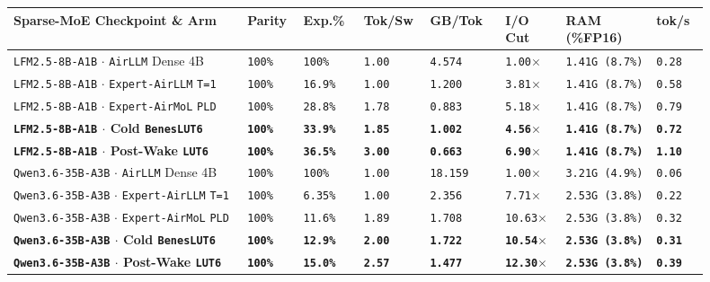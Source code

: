 \documentclass[10pt]{article}
\begin{document}
{\footnotesize\setlength{\tabcolsep}{2.8pt}
\begin{longtable}{@{}L{0.31\linewidth}C{0.07\linewidth}C{0.08\linewidth}C{0.07\linewidth}C{0.10\linewidth}C{0.08\linewidth}C{0.12\linewidth}C{0.07\linewidth}@{}}
\toprule
\textbf{Sparse-MoE Checkpoint \& Arm} & \textbf{Parity} & \textbf{Exp.\%} & \textbf{Tok/Sw} & \textbf{GB/Tok} & \textbf{I/O Cut} & \textbf{RAM (\%FP16)} & \textbf{tok/s} \\
\midrule
\endhead
\texttt{LFM2.5-8B-A1B} $\cdot$ \texttt{AirLLM} Dense 4B & \texttt{100\%} & \texttt{100\%} & \texttt{1.00} & \texttt{4.574} & \texttt{1.00$\times$} & \texttt{1.41G (8.7\%)} & \texttt{0.28} \\
\texttt{LFM2.5-8B-A1B} $\cdot$ \texttt{Expert-AirLLM} \texttt{T=1} & \texttt{100\%} & \texttt{16.9\%} & \texttt{1.00} & \texttt{1.200} & \texttt{3.81$\times$} & \texttt{1.41G (8.7\%)} & \texttt{0.58} \\
\texttt{LFM2.5-8B-A1B} $\cdot$ \texttt{Expert-AirMoL} \texttt{PLD} & \texttt{100\%} & \texttt{28.8\%} & \texttt{1.78} & \texttt{0.883} & \texttt{5.18$\times$} & \texttt{1.41G (8.7\%)} & \texttt{0.79} \\
\textbf{\texttt{LFM2.5-8B-A1B} $\cdot$ Cold \texttt{BenesLUT6}} & \textbf{\texttt{100\%}} & \textbf{\texttt{33.9\%}} & \textbf{\texttt{1.85}} & \textbf{\texttt{1.002}} & \textbf{\texttt{4.56$\times$}} & \textbf{\texttt{1.41G (8.7\%)}} & \textbf{\texttt{0.72}} \\
\textbf{\texttt{LFM2.5-8B-A1B} $\cdot$ Post-Wake \texttt{LUT6}} & \textbf{\texttt{100\%}} & \textbf{\texttt{36.5\%}} & \textbf{\texttt{3.00}} & \textbf{\texttt{0.663}} & \textbf{\texttt{6.90$\times$}} & \textbf{\texttt{1.41G (8.7\%)}} & \textbf{\texttt{1.10}} \\
\midrule
\texttt{Qwen3.6-35B-A3B} $\cdot$ \texttt{AirLLM} Dense 4B & \texttt{100\%} & \texttt{100\%} & \texttt{1.00} & \texttt{18.159} & \texttt{1.00$\times$} & \texttt{3.21G (4.9\%)} & \texttt{0.06} \\
\texttt{Qwen3.6-35B-A3B} $\cdot$ \texttt{Expert-AirLLM} \texttt{T=1} & \texttt{100\%} & \texttt{6.35\%} & \texttt{1.00} & \texttt{2.356} & \texttt{7.71$\times$} & \texttt{2.53G (3.8\%)} & \texttt{0.22} \\
\texttt{Qwen3.6-35B-A3B} $\cdot$ \texttt{Expert-AirMoL} \texttt{PLD} & \texttt{100\%} & \texttt{11.6\%} & \texttt{1.89} & \texttt{1.708} & \texttt{10.63$\times$} & \texttt{2.53G (3.8\%)} & \texttt{0.32} \\
\textbf{\texttt{Qwen3.6-35B-A3B} $\cdot$ Cold \texttt{BenesLUT6}} & \textbf{\texttt{100\%}} & \textbf{\texttt{12.9\%}} & \textbf{\texttt{2.00}} & \textbf{\texttt{1.722}} & \textbf{\texttt{10.54$\times$}} & \textbf{\texttt{2.53G (3.8\%)}} & \textbf{\texttt{0.31}} \\
\textbf{\texttt{Qwen3.6-35B-A3B} $\cdot$ Post-Wake \texttt{LUT6}} & \textbf{\texttt{100\%}} & \textbf{\texttt{15.0\%}} & \textbf{\texttt{2.57}} & \textbf{\texttt{1.477}} & \textbf{\texttt{12.30$\times$}} & \textbf{\texttt{2.53G (3.8\%)}} & \textbf{\texttt{0.39}} \\
\bottomrule
\end{longtable}
}
\end{document}
